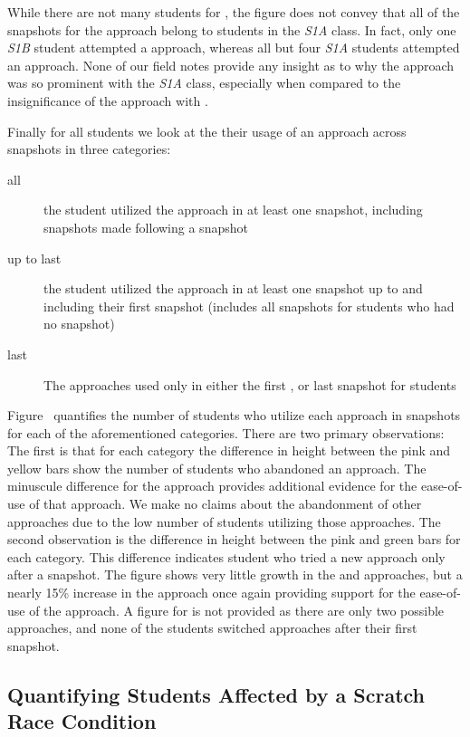 While there are not many students for \sone{}, the figure does not convey that
all of the \com{} snapshots for the \rel{} approach belong to students in the
\emph{S1A} class. In fact, only one \emph{S1B} student attempted a \rel{}
approach, whereas all but four \emph{S1A} students attempted an \abs{}
approach. None of our field notes provide any insight as to why the \rel{}
approach was so prominent with the \emph{S1A} class, especially when compared
to the insignificance of the \rel{} approach with \stwo{}.

Finally for all students we look at the their usage of an approach across
snapshots in three categories:

\begin{description}
\item[all] the student utilized the approach in at least one snapshot,
  including snapshots made following a \com{} snapshot
\item[up to last] the student utilized the approach in at least one snapshot up
  to and including their first \com{} snapshot (includes all snapshots for
  students who had no \com{} snapshot)
\item[last] The approaches used only in either the first \com{}, or last
  snapshot for \incom{} students
\end{description}

Figure~ quantifies the number of students who
utilize each approach in \stwo{} snapshots for each of the aforementioned
categories. There are two primary observations: The first is that for each
category the difference in height between the pink and yellow bars show the
number of students who abandoned an approach. The minuscule difference for the
\glideto{} approach provides additional evidence for the ease-of-use of that
approach. We make no claims about the abandonment of other approaches due to
the low number of students utilizing those approaches. The second observation
is the difference in height between the pink and green bars for each
category. This difference indicates student who tried a new approach only after
a \com{} snapshot. The figure shows very little growth in the \abs{} and \rel{}
approaches, but a nearly 15\% increase in the \glideto{} approach once again
providing support for the ease-of-use of the \glideto{} approach. A figure for
\sone{} is not provided as there are only two possible approaches, and none of
the students switched approaches after their first \com{} snapshot.

\subsection{Quantifying Students Affected by a Scratch Race Condition}

